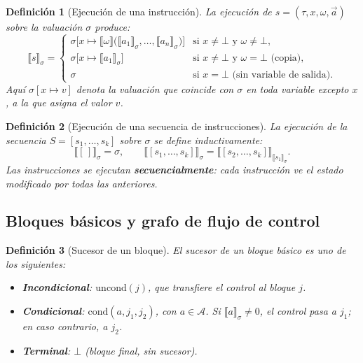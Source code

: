 \documentclass[12pt, a4paper]{article}
\newtheorem{definition}{Definición}[section]
\begin{document}
\begin{definition}[Ejecución de una instrucción]
\label{def:ejec-instruccion}
La ejecución de $s = (\tau, x, \omega, \vec{a})$ sobre la valuación $\sigma$ produce:
\[
  \llbracket s \rrbracket_\sigma =
  \begin{cases}
    \sigma\bigl[x \mapsto \llbracket \omega \rrbracket\bigl(\llbracket a_1 \rrbracket_\sigma, \ldots, \llbracket a_n \rrbracket_\sigma\bigr)\bigr]
      & \text{si } x \neq \bot \text{ y } \omega \neq \bot,\\[4pt]
    \sigma\bigl[x \mapsto \llbracket a_1 \rrbracket_\sigma\bigr]
      & \text{si } x \neq \bot \text{ y } \omega = \bot \text{ (copia)},\\[4pt]
    \sigma
      & \text{si } x = \bot \text{ (sin variable de salida)}.
  \end{cases}
\]
Aquí $\sigma[x \mapsto v]$ denota la valuación que coincide con $\sigma$ en toda variable
excepto $x$, a la que asigna el valor $v$.
\end{definition}

\begin{definition}[Ejecución de una secuencia de instrucciones]
\label{def:ejec-secuencia}
La ejecución de la secuencia $S = [s_1, \ldots, s_k]$ sobre $\sigma$ se define inductivamente:
\[
  \llbracket [\,] \rrbracket_\sigma = \sigma, \qquad
  \llbracket [s_1, \ldots, s_k] \rrbracket_\sigma =
    \llbracket [s_2, \ldots, s_k] \rrbracket_{\llbracket s_1 \rrbracket_\sigma}.
\]
Las instrucciones se ejecutan \textbf{secuencialmente}: cada instrucción ve el estado modificado
por todas las anteriores.
\end{definition}

\subsection{Bloques básicos y grafo de flujo de control}

\begin{definition}[Sucesor de un bloque]
El \emph{sucesor} de un bloque básico es uno de los siguientes:
\begin{itemize}
  \item \textbf{Incondicional}: $\mathrm{uncond}(j)$, que transfiere el control al bloque $j$.
  \item \textbf{Condicional}: $\mathrm{cond}(a, j_1, j_2)$, con $a \in \mathcal{A}$. Si
    $\llbracket a \rrbracket_\sigma \neq 0$, el control pasa a $j_1$; en caso contrario, a $j_2$.
  \item \textbf{Terminal}: $\bot$ (bloque final, sin sucesor).
\end{itemize}
\end{definition}
\end{document}
